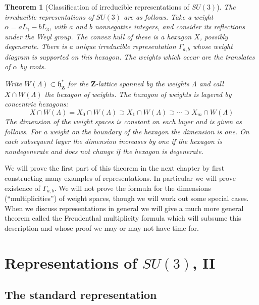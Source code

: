 \documentclass[12pt]{article}
\newcommand{\ZZ}{\mathbf{Z}}
\newtheorem{thm}{Theorem}[section]
\theoremstyle{definition}
\theoremstyle{check}
\theoremstyle{remark}
\theoremstyle{TheoremNum}
\begin{document}
\begin{thm}[Classification of irreducible representations of $SU(3)$]\label{thm-classif-su3}
The irreducible representations of $SU(3)$ are as follows. Take a weight $\alpha=aL_1-bL_3$, with $a$ and $b$ nonnegative integers, and consider its reflections under the Weyl group. The convex hull of these is a hexagon $X$, possibly degenerate. There is a unique irreducible representation $\Gamma_{a,b}$ whose weight diagram is supported on this hexagon. The weights which occur are the translates of $\alpha$ by roots.

Write $W(\Lambda)\subset\mathfrak{h}_{\ZZ}^*$ for the $\ZZ$-lattice spanned by the weights $\Lambda$ and call $X\cap W(\Lambda)$ the {\em hexagon of weights}. The hexagon of weights is layered by concentric hexagons:
\[X\cap W(\Lambda)=X_0\cap W(\Lambda)\supset X_1\cap W(\Lambda)\supset\cdots\supset X_m\cap W(\Lambda)\]
The dimension of the weight spaces is constant on each layer and is given as follows. For a weight on the boundary of the hexagon the dimension is one. On each subsequent layer the dimension increases by one if the hexagon is nondegenerate and does not change if the hexagon is degenerate.
\end{thm}

We will prove the first part of this theorem in the next chapter by first constructing many examples of representations. In particular we will prove existence of $\Gamma_{a,b}$. We will not prove the formula for the dimensions (``multiplicities'') of weight spaces, though we will work out some special cases. When we discuss representations in general we will give a much more general theorem called the Freudenthal multiplicity formula which will subsume this description and whose proof we may or may not have time for.



\section{Representations of \texorpdfstring{$SU(3)$}{SU(3)}, II}

\subsection{The standard representation}
\end{document}
